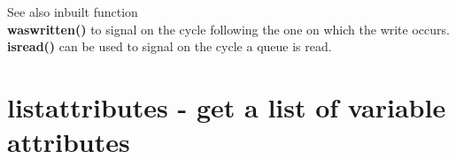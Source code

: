        See also inbuilt function \\
        {\bf waswritten()}
         to signal on the cycle following the one on
        which the write occurs. \\
        {\bf isread()}  can be
        used to signal on the cycle a queue is read.


%        
%        
%        
%        
%
%        
%        
%        
 

    \section{listattributes - get a list of variable attributes}\label{sec:iflistattrs}
        
